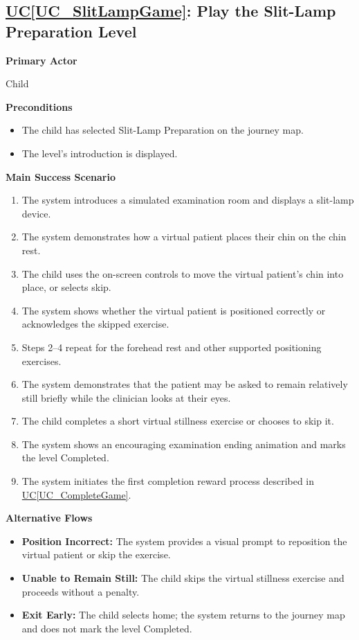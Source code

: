 \documentclass[12pt]{article}
\newcounter{ucnum} %
\newcommand{\ucref}[1]{\hyperref[#1]{UC\ref*{#1}}}
\begin{document}
\label{UC_SlitLampGame}
\subsection{\ucref{UC_SlitLampGame}: Play the Slit-Lamp Preparation Level}

\textbf{Primary Actor}

Child

\textbf{Preconditions}
\begin{itemize}
    \item The child has selected Slit-Lamp Preparation on the journey map.
    \item The level's introduction is displayed.
\end{itemize}

\textbf{Main Success Scenario}
\begin{enumerate}
    \item The system introduces a simulated examination room and
    displays a slit-lamp device.
    \item The system demonstrates how a virtual patient places
    their chin on the chin rest.
    \item The child uses the on-screen controls to move the
    virtual patient's chin into place, or selects skip.
    \item The system shows whether the virtual patient is positioned
    correctly or acknowledges the skipped exercise.
    \item Steps 2--4 repeat for the forehead rest and other
    supported positioning exercises.
    \item The system demonstrates that the patient may be asked
    to remain relatively still briefly while the clinician looks
    at their eyes.
    \item The child completes a short virtual stillness exercise
    or chooses to skip it.
    \item The system shows an encouraging examination ending
    animation and marks the level Completed.
    \item The system initiates the first completion reward process
    described in \ucref{UC_CompleteGame}.
\end{enumerate}

\textbf{Alternative Flows}
\begin{itemize}
    \item \textbf{Position Incorrect:} The system provides a visual
    prompt to reposition the virtual patient or skip the exercise.
    \item \textbf{Unable to Remain Still:} The child skips the
    virtual stillness exercise and proceeds without a penalty.
    \item \textbf{Exit Early:} The child selects home; the system
    returns to the journey map and does not mark the level Completed.
\end{itemize}
\end{document}
